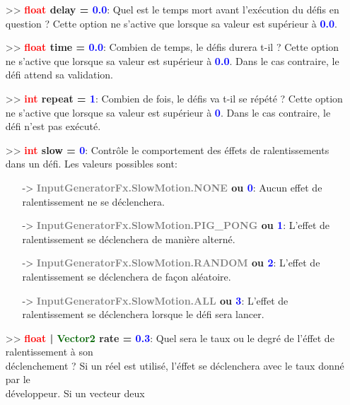 \documentclass[a4paper, 11pt]{article}
\begin{document}
	\begin{itemize}
		\item[>> \textbf{\textcolor{red}{float} delay = \textcolor{blue}{0.0}}:] Quel est le temps mort 
		avant l'exécution du défis en question ? Cette option ne s'active que lorsque sa valeur est 
		supérieur à \textcolor{blue}{\textbf{0.0}}.\\
		\item[>> \textbf{\textcolor{red}{float} time = \textcolor{blue}{0.0}}:] Combien de temps, le défis 
		durera t-il ? Cette option ne s'active que lorsque sa valeur est supérieur à \textcolor{blue}
		{\textbf{0.0}}. Dans le cas contraire, le défi attend sa validation.\\
		\item[>> \textbf{\textcolor{red}{int} repeat = \textcolor{blue}{1}}:] Combien de fois, le défis va 
		t-il se répété ? Cette option ne s'active que lorsque sa valeur est supérieur à \textcolor{blue}
		{\textbf{0}}. Dans le cas contraire, le défi n'est pas exécuté.\\
		\item[>> \textbf{\textcolor{red}{int} slow = \textcolor{blue}{0}}:] Contrôle le comportement des 
		éffets de ralentissements dans un défi. Les valeurs possibles sont:
		\begin{itemize}
			\item[-> \textbf{\textcolor{gray}{InputGeneratorFx.SlowMotion.NONE} ou \textcolor{blue}{0}}:] 
			Aucun effet de ralentissement ne se déclenchera.
			\item[-> \textbf{\textcolor{gray}{InputGeneratorFx.SlowMotion.PIG\_PONG} ou \textcolor{blue}
			{1}}:] L'effet de ralentissement se déclenchera de manière alterné.
			\item[-> \textbf{\textcolor{gray}{InputGeneratorFx.SlowMotion.RANDOM} ou \textcolor{blue}{2}}:] 
			L'effet de ralentissement se déclenchera de façon aléatoire.
			\item[-> \textbf{\textcolor{gray}{InputGeneratorFx.SlowMotion.ALL} ou \textcolor{blue}{3}}:] 
			L'effet de ralentissement se déclenchera lorsque le défi sera lancer.\\
		\end{itemize}
		\item[>> \textbf{\textcolor{red}{float} | \textcolor{darkgreen}{Vector2} rate = \textcolor{blue}
		{0.3}}:] Quel sera le taux ou le degré de l'éffet de ralentissement à son \\déclenchement ? Si un 
		réel est utilisé, l'éffet se déclenchera avec le taux donné par le \\développeur. Si un vecteur deux 

\end{itemize}
\end{document}
